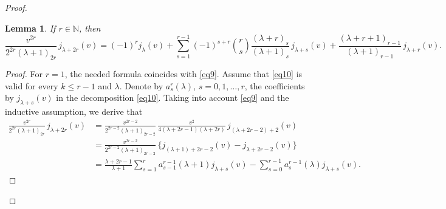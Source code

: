 \documentclass[12pt,twoside,reqno]{amsart}\usepackage[cp1251]{inputenc}
\theoremstyle{plain}
\newtheorem{lemma}[theorem]{Lemma}
\theoremstyle{remark}
\begin{document}
\begin{proof}
\begin{lemma}\label{lem1}
If $r\in\mathbb{N}$, then
\begin{equation}\label{eq10}
\frac{v^{2r}}{2^{2r}(\lambda+1)_{2r}}\,j_{\lambda+2r}(v)=
(-1)^{r}j_{\lambda}(v)+\sum_{s=1}^{r-1}(-1)^{s+r}
\binom{r}{s}\frac{(\lambda+r)_{s}}{(\lambda+1)_{s}}\,j_{\lambda+s}(v)
+\frac{(\lambda+r+1)_{r-1}}{(\lambda+1)_{r-1}}\,j_{\lambda+r}(v).
\end{equation}
\end{lemma}

\begin{proof} For  $r=1$, the needed formula coincides with  \eqref{eq9}.
Assume that \eqref{eq10} is valid for every $k\le r-1$ and  $\lambda$.
 Denote by
 $a_{s}^r(\lambda)$, $s=0,1,\dots,r$,
 the coefficients by
 $j_{\lambda+s}(v)$ in the decomposition  \eqref{eq10}.
  Taking into account  \eqref{eq9} and the inductive assumption, we derive that
\begin{align*}
\frac{v^{2r}}{2^{2r}(\lambda+1)_{2r}}\,j_{\lambda+2r}(v)&=
\frac{v^{2r-2}}{2^{2r-2}(\lambda+1)_{2r-2}}\,\frac{v^2}{4(\lambda+2r-1)(\lambda+2r)}\,j_{(\lambda+2r-2)+2}(v)
\\
&=\frac{v^{2r-2}}{2^{2r-2}(\lambda+1)_{2r-2}}\,\{j_{(\lambda+1)+2r-2}(v)-j_{\lambda+2r-2}(v)\}
\\
&=\frac{\lambda+2r-1}{\lambda+1}\sum_{s=1}^{r}a_{s-1}^{r-1}(\lambda+1)j_{\lambda+s}(v)-
\sum_{s=0}^{r-1}a_{s}^{r-1}(\lambda)j_{\lambda+s}(v).
\end{align*}


\end{proof}
\end{proof}
\end{document}
